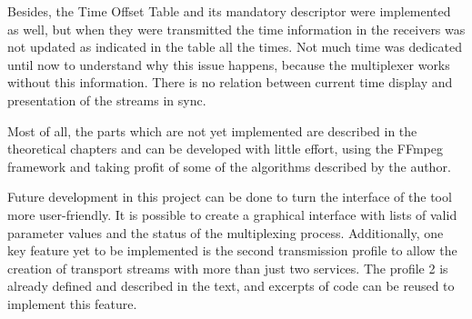\documentclass[
	12pt,				%
	openright,			%
	twoside,			%
	a4paper,			%
	brazil,
	french,				%
	english
	]{abntex2}
\begin{document}
Besides, the Time Offset Table and its mandatory descriptor were implemented as well, but when they were transmitted the time information in the receivers was not updated as indicated in the table all the times. Not much time was dedicated until now to understand why this issue happens, because the multiplexer works without this information. There is no relation between current time display and presentation of the streams in sync.

Most of all, the parts which are not yet implemented are described in the theoretical chapters and can be developed with little effort, using the FFmpeg framework and taking profit of some of the algorithms described by the author.

Future development in this project can be done to turn the interface of the tool more user-friendly. It is possible to create a graphical interface with lists of valid parameter values and the status of the multiplexing process. Additionally, one key feature yet to be implemented is the second transmission profile to allow the creation of transport streams with more than just two services. The profile 2 is already defined and described in the text, and excerpts of code can be reused to implement this feature.




\postextual



%
%

\end{document}
